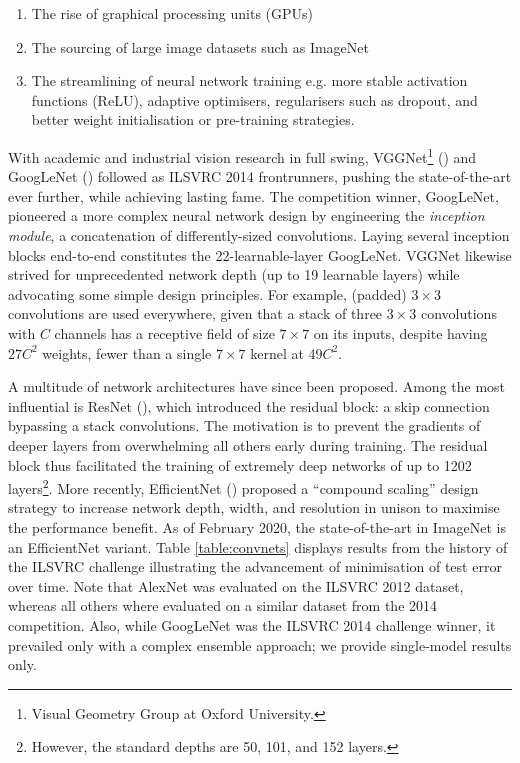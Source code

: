 \begin{enumerate}
\item The rise of graphical processing units (GPUs)
\item The sourcing of large image datasets such as ImageNet
\item The streamlining of neural network training e.g. more stable activation functions (ReLU), adaptive optimisers, regularisers such as dropout, and better weight initialisation or pre-training strategies.
\end{enumerate}

With academic and industrial vision research in full swing, VGGNet\footnote{Visual Geometry Group at Oxford University.} (\cite{simonyan2014very}) and GoogLeNet (\cite{szegedy2015going}) followed as ILSVRC 2014 frontrunners, pushing the state-of-the-art ever further, while achieving lasting fame. The competition winner, GoogLeNet, pioneered a more complex neural network design by engineering the \emph{inception module}, a concatenation of differently-sized convolutions. Laying several inception blocks end-to-end constitutes the 22-learnable-layer GoogLeNet. VGGNet likewise strived for unprecedented network depth (up to 19 learnable layers) while advocating some simple design principles. For example, (padded) $3\times 3$ convolutions are used everywhere, given that a stack of three $3 \times 3$ convolutions with $C$ channels has a receptive field of size $7 \times 7$ on its inputs, despite having $27C^2$ weights, fewer than a single $7 \times 7$ kernel at $49C^2$.

A multitude of network architectures have since been proposed. Among the most influential is ResNet (\cite{he2016deep}), which introduced the residual block: a skip connection bypassing a stack convolutions. The motivation is to prevent the gradients of deeper layers from overwhelming all others early during training. The residual block thus facilitated the training of extremely deep networks of up to 1202 layers\footnote{However, the standard depths are 50, 101, and 152 layers.}. More recently, EfficientNet (\cite{tan2019efficientnet}) proposed a ``compound scaling'' design strategy to increase network depth, width, and resolution in unison to maximise the performance benefit. As of February 2020, the state-of-the-art in ImageNet is an EfficientNet variant. Table \ref{table:convnets} displays results from the history of the ILSVRC challenge illustrating the advancement of minimisation of test error over time. Note that AlexNet was evaluated on the ILSVRC 2012 dataset, whereas all others where evaluated on a similar dataset from the 2014 competition. Also, while GoogLeNet was the ILSVRC 2014 challenge winner, it prevailed only with a complex ensemble approach; we provide single-model results only. 

